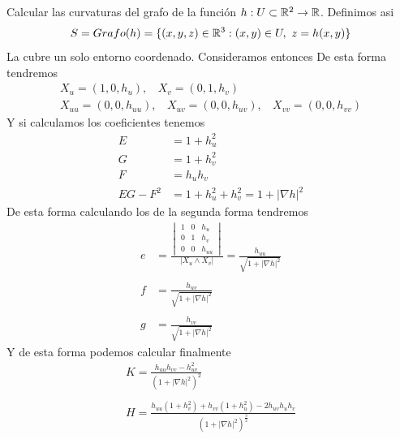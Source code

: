 \begin{ejercicio}
    Calcular las curvaturas del grafo de la función $h:U\subset \mathbb{R}^2 \to \mathbb{R}$. Definimos asi
    \begin{gather*}
        S = Grafo(h) = \{(x,y,z)\in \mathbb{R}^3 : (x,y)\in U, \ z=h(x,y)\}
    \end{gather*}
    La cubre un solo entorno coordenado. Consideramos entonces
    De esta forma tendremos
    \begin{gather*}
        X_u = (1,0,h_u),\ \ \ \ X_v = (0,1,h_v)\\
        X_{uu} = (0,0,h_{uu}),\ \ \ \ X_{uv} = (0,0,h_{uv}),\ \ \ \ X_{vv} = (0,0,h_{vv})
    \end{gather*}
    Y si calculamos los coeficientes tenemos
    \begin{align*}
        E &= 1+h_u^2\\
        G &= 1+h_v^2\\
        F &= h_uh_v\\
        EG - F^2 &= 1+h_u^2 + h_v^2 = 1 + |\nabla h|^2
    \end{align*}
    De esta forma calculando los de la segunda forma tendremos 
    \begin{align*}
        e& = \frac{
        \begin{vmatrix}
            1 & 0 & h_u\\
            0 & 1 & h_v\\
            0 & 0 & h_{uu}
        \end{vmatrix}}{|X_u \wedge X_v|} = \frac{h_{uu}}{\sqrt{1 + |\nabla h|^2}}\\\\
        f &= \frac{h_{uv}}{\sqrt{1 + |\nabla h|^2}}\\\\
        g &= \frac{h_{vv}}{\sqrt{1 + |\nabla h|^2}}
    \end{align*}
    Y de esta forma podemos calcular finalmente
    \begin{gather*}
        K = \frac{h_{uu}h_{vv} - h^2_{uv}}{(1 + |\nabla h|^2)^2}\\\\
        H = \frac{h_{uu}(1+h_v^2) + h_{vv}(1+h_u^2) - 2 h_{uv}h_{u}h_{v}}{(1 + |\nabla h|^2)^{\frac{3}{2}}}
    \end{gather*}
\end{ejercicio}




